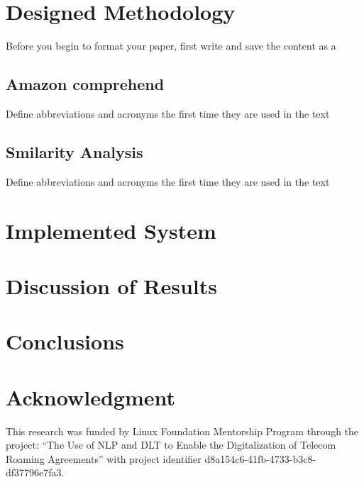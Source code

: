 \documentclass[conference]{style/IEEEtran}
\begin{document}
\section{Designed Methodology}
Before you begin to format your paper, first write and save the content as a

\subsection{Amazon comprehend}\label{AA}
Define abbreviations and acronyms the first time they are used in the text

\subsection{Smilarity Analysis}
Define abbreviations and acronyms the first time they are used in the text

\section{Implemented System}

\section{Discussion of Results}

\section{Conclusions}

\section*{Acknowledgment}
This research was funded by Linux Foundation Mentorship Program through the project: “The Use of NLP and DLT to Enable the Digitalization of Telecom Roaming Agreements” with project identifier d8a154c6-41fb-4733-b3c8-df37796e7fa3.
\end{document}
